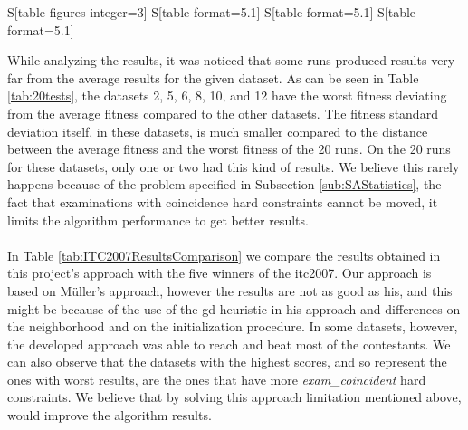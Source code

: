 \begin{table}[!t]
\begin{tabular}{%
	S[table-figures-integer=3]%
	S[table-format=5.1]%
	S[table-format=5.1]%
	S[table-format=5.1]%
    }
\end{tabular}
\label{tab:PrevApprVSNewAppr}
\end{table}While analyzing the results, it was noticed that some runs produced results very far from the average results for the given dataset. As can be seen in Table \ref{tab:20tests}, the datasets 2, 5, 6, 8, 10, and 12 have the worst fitness deviating from the average fitness compared to the other datasets. The fitness standard deviation itself, in these datasets, is much smaller compared to the distance between the average fitness and the worst fitness of the 20 runs. On the 20 runs for these datasets, only one or two had this kind of results. We believe this rarely happens because of the problem specified in Subsection \ref{sub:SAStatistics}, the fact that examinations with coincidence hard constraints cannot be moved, it limits the algorithm performance to get better results.\\
\\
In Table \ref{tab:ITC2007ResultsComparison} we compare the results obtained in this project's approach with the five winners of the \gls{itc2007}. Our approach is based on M\"{u}ller's \cite{Mueller2009} approach, however the results are not as good as his, and this might be because of the use of the \gls{gd} heuristic in his approach and differences on the neighborhood and on the initialization procedure. In some datasets, however, the developed approach was able to reach and beat most of the contestants. We can also observe that the datasets with the highest scores, and so represent the ones with worst results, are the ones that have more \textit{exam\_coincident} hard constraints. We believe that by solving this approach limitation mentioned above, would improve the algorithm results.\\
\\
